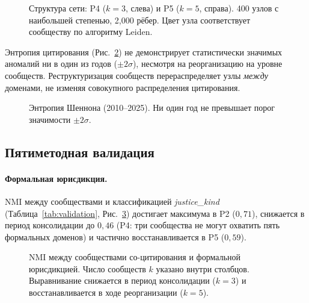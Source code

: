 \documentclass[11pt]{article}
\begin{document}
\begin{figure}[t]
\centering

\caption{Структура сети: P4 ($k=3$, слева) и P5 ($k=5$, справа). 400 узлов с наибольшей степенью, 2{,}000 рёбер. Цвет узла соответствует сообществу по алгоритму Leiden.}
\label{fig:network}
\end{figure}

Энтропия цитирования (Рис.~\ref{fig:entropy}) не демонстрирует статистически значимых аномалий ни в один из годов ($\pm 2\sigma$), несмотря на реорганизацию на уровне сообществ.
Реструктуризация сообществ перераспределяет узлы \emph{между} доменами, не изменяя совокупного распределения цитирования.

\begin{figure}[t]
\centering

\caption{Энтропия Шеннона (2010--2025). Ни один год не превышает порог значимости $\pm 2\sigma$.}
\label{fig:entropy}
\end{figure}

\subsection{Пятиметодная валидация}

\paragraph{Формальная юрисдикция.}
NMI между сообществами и классификацией \emph{justice\_kind} (Таблица~\ref{tab:validation}, Рис.~\ref{fig:validation_jk}) достигает максимума в P2 ($0{,}71$), снижается в период консолидации до $0{,}46$ (P4: три сообщества не могут охватить пять формальных доменов) и частично восстанавливается в P5 ($0{,}59$).

\begin{figure}[t]
\centering

\caption{NMI между сообществами со-цитирования и формальной юрисдикцией. Число сообществ $k$ указано внутри столбцов. Выравнивание снижается в период консолидации ($k{=}3$) и восстанавливается в ходе реорганизации ($k{=}5$).}
\label{fig:validation_jk}
\end{figure}
\end{document}
